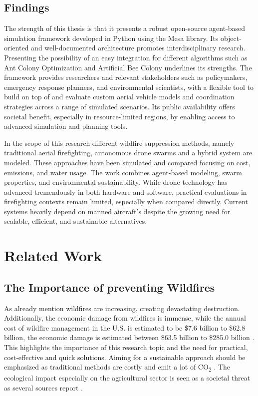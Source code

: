 \documentclass[11pt, a4paper]{article}
\begin{document}
\subsection{Findings}


The strength of this thesis is that it presents a robust open-source agent-based simulation framework developed in Python using the Mesa library. Its object-oriented and well-documented architecture promotes interdisciplinary research. Presenting the possibility of an easy integration for different algorithms such as Ant Colony Optimization and Artificial Bee Colony underlines its strengths. The framework provides researchers and relevant stakeholders such as policymakers, emergency response planners, and environmental scientists, with a flexible tool to build on top of and evaluate custom aerial vehicle models and coordination strategies across a range of simulated scenarios. Its public availability offers societal benefit, especially in resource-limited regions, by enabling access to advanced simulation and planning tools.


In the scope of this research different wildfire suppression methods, namely traditional aerial firefighting, autonomous drone swarms and a hybrid system are modeled. These approaches have been simulated and compared focusing on cost, emissions, and water usage. The work combines agent-based modeling, swarm properties, and environmental sustainability. While drone technology has advanced tremendously in both hardware and software, practical evaluations in firefighting contexts remain limited, especially when compared directly. Current systems heavily depend on manned aircraft's despite the growing need for scalable, efficient, and sustainable alternatives.


\section{Related Work}

\subsection{The Importance of preventing Wildfires}
As already mention wildfires are increasing, creating devastating destruction. Additionally, the economic damage from wildfires is immense, while the annual cost of wildfire management in the U.S. is estimated to be \$7.6 billion to \$62.8 billion, the economic damage is estimated between \$63.5 billion to \$285.0 billion \citep{Afghah2019}. This highlights the importance of this research topic and the need for practical, cost-effective and quick solutions. Aiming for a sustainable approach should be emphasized as traditional methods are costly and emit a lot of CO\textsubscript{2} \citep{Saffre2022}. The ecological impact especially on the agricultural sector is seen as a societal threat as several sources report \citep{grassland_Wildfires,IPCC2023}. 
\end{document}
